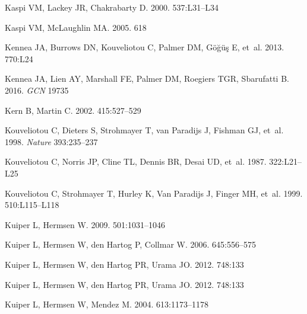 \documentclass[letterpaper]{ar-1col}
\begin{document}
\begin{thebibliography}{}
Kaspi VM, Lackey JR, Chakrabarty D. 2000.
\textit{\apj} 537:L31--L34

{Kaspi} VM, {McLaughlin} MA. 2005.
\textit{\apj} 618

{Kennea} JA, {Burrows} DN, {Kouveliotou} C, {Palmer} DM, {G{\"o}{\u g}{\"u}{\c
  s}} E, et~al. 2013.
\textit{\apjl} 770:L24

Kennea JA, Lien AY, Marshall FE, Palmer DM, Roegiers TGR, Sbarufatti B. 2016.
\textit{GCN} 19735

Kern B, Martin C. 2002.
\textit{\nat} 415:527--529

Kouveliotou C, Dieters S, Strohmayer T, van Paradijs J, Fishman GJ, et~al.
  1998.
\textit{Nature} 393:235--237

{Kouveliotou} C, {Norris} JP, {Cline} TL, {Dennis} BR, {Desai} UD, et~al. 1987.
\textit{\apjl} 322:L21--L25

{Kouveliotou} C, {Strohmayer} T, {Hurley} K, {Van Paradijs} J, {Finger} MH,
  et~al. 1999.
\textit{\apj} 510:L115--L118

{Kuiper} L, {Hermsen} W. 2009.
\textit{\aap} 501:1031--1046

Kuiper L, Hermsen W, den Hartog P, Collmar W. 2006.
\textit{\apj} 645:556--575

{Kuiper} L, {Hermsen} W, {den Hartog} PR, {Urama} JO. 2012{}.
\textit{\apj} 748:133

{Kuiper} L, {Hermsen} W, {den Hartog} PR, {Urama} JO. 2012{}.
\textit{\apj} 748:133

{Kuiper} L, {Hermsen} W, {Mendez} M. 2004.
\textit{\apj} 613:1173--1178


\end{thebibliography}
\end{document}
